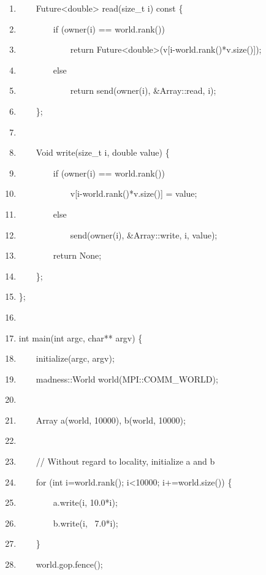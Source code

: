 \documentclass[letterpaper]{article}
\begin{document}
\begin{center}
\begin{minipage}{}
\begin{enumerate}
\bigskip
\item {\ttfamily
\ \ \ \ Future{\textless}double{\textgreater} read(size\_t i) const \{}
\item {\ttfamily
\ \ \ \ \ \ \ \ if (owner(i) == world.rank())}
\item {\ttfamily
\ \ \ \ \ \ \ \ \ \ \ \ return Future{\textless}double{\textgreater}(v[i-world.rank()*v.size()]);}
\item {\ttfamily
\ \ \ \ \ \ \ \ else}
\item {\ttfamily
\ \ \ \ \ \ \ \ \ \ \ \ return send(owner(i), \&Array::read, i);}
\item {\ttfamily
\ \ \ \ \};}
\item 
\bigskip
\item {\ttfamily
\ \ \ \ Void write(size\_t i, double value) \{}
\item {\ttfamily
\ \ \ \ \ \ \ \ if (owner(i) == world.rank())}
\item {\ttfamily
\ \ \ \ \ \ \ \ \ \ \ \ v[i-world.rank()*v.size()] = value;}
\item {\ttfamily
\ \ \ \ \ \ \ \ else}
\item {\ttfamily
\ \ \ \ \ \ \ \ \ \ \ \ send(owner(i), \&Array::write, i, value);}
\item {\ttfamily
\ \ \ \ \ \ \ \ return None;}
\item {\ttfamily
\ \ \ \ \};}
\item {\ttfamily
\};}
\item 
\bigskip
\item {\ttfamily
int main(int argc, char** argv) \{}
\item {\ttfamily
\ \ \ \ initialize(argc, argv);}
\item {\ttfamily
\ \ \ \ madness::World world(MPI::COMM\_WORLD);}
\item 
\bigskip
\item {\ttfamily
\ \ \ \ Array a(world, 10000), b(world, 10000);}
\item 
\bigskip
\item {\ttfamily
\ \ \ \ // Without regard to locality, initialize a and b}
\item {\ttfamily
\ \ \ \ for (int i=world.rank(); i{\textless}10000; i+=world.size()) \{}
\item {\ttfamily
\ \ \ \ \ \ \ \ a.write(i, 10.0*i);}
\item {\ttfamily
\ \ \ \ \ \ \ \ b.write(i, \ 7.0*i);}
\item {\ttfamily
\ \ \ \ \}}
\item {\ttfamily
\ \ \ \ world.gop.fence();}

\end{enumerate}
\end{minipage}
\end{center}
\end{document}
